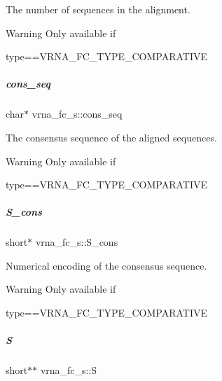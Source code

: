 The number of sequences in the alignment. 

\begin{DoxyWarning}{Warning}
Only available if\begin{DoxyVerb}type==VRNA_FC_TYPE_COMPARATIVE \end{DoxyVerb}
 
\end{DoxyWarning}
\mbox{\label{group__fold__compound_ac472afde64d8b3c8b84e4809fda7d814}} 
\subparagraph{\texorpdfstring{cons\+\_\+seq}{cons\_seq}}
{\footnotesize\ttfamily char$\ast$ vrna\+\_\+fc\+\_\+s\+::cons\+\_\+seq}



The consensus sequence of the aligned sequences. 

\begin{DoxyWarning}{Warning}
Only available if\begin{DoxyVerb}type==VRNA_FC_TYPE_COMPARATIVE \end{DoxyVerb}
 
\end{DoxyWarning}
\mbox{\label{group__fold__compound_aa3fab7ae38ebfed2028375221d295686}} 
\subparagraph{\texorpdfstring{S\+\_\+cons}{S\_cons}}
{\footnotesize\ttfamily short$\ast$ vrna\+\_\+fc\+\_\+s\+::\+S\+\_\+cons}



Numerical encoding of the consensus sequence. 

\begin{DoxyWarning}{Warning}
Only available if\begin{DoxyVerb}type==VRNA_FC_TYPE_COMPARATIVE \end{DoxyVerb}
 
\end{DoxyWarning}
\mbox{\label{group__fold__compound_aebb37297f92c7bd22aac6343f8f61d61}} 
\subparagraph{\texorpdfstring{S}{S}}
{\footnotesize\ttfamily short$\ast$$\ast$ vrna\+\_\+fc\+\_\+s\+::S}



